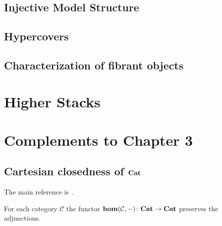 \cite{jardinepresheaves}

\subsection{Injective Model Structure}

\subsection{Hypercovers}

\cite{hypercover}

\subsection{Characterization of fibrant objects}


\section{Higher Stacks}

\section{Complements to Chapter 3}

\subsection{Cartesian closedness of $\mathbf{Cat}$}

The main reference is \cite[Ch. VI]{sga1}.

\begin{lemma} \label{lemma internal hom adjunctions}
For each category $\mathcal C$ the functor $\mathbf{hom}(\mathcal C, -) \colon \mathbf{Cat} \to \mathbf{Cat}$ preserves the adjunctions.
\end{lemma}

